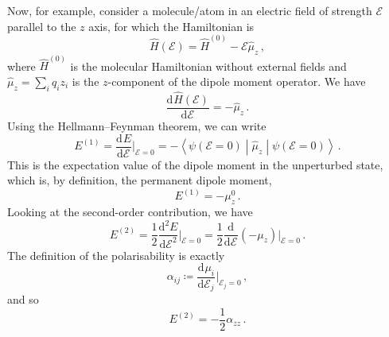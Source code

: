 \documentclass{article}
\theoremstyle{plain}\theoremheaderfont{\normalfont\itshape}\theorembodyfont{\rmfamily}\theoremseparator{.}\newtheorem*{rem}{Remark}\newtheorem*{ex}{Example}\newtheorem*{proof}{Proof}\newtheorem*{altp}{Alternative proof}
\theoremstyle{plain}\theoremheaderfont{\normalfont\bfseries}\theorembodyfont{\rmfamily}\theoremseparator{.}\newtheorem{thm}{Theorem}[section]\newtheorem{lem}[thm]{Lemma}\newtheorem{prop}[thm]{Proposition}\newtheorem*{cor}{Corollary}\newtheorem{defn}[thm]{Definition}\newtheorem{clm}[thm]{Claim}\newtheorem{clminproof}{Claim}
\theoremstyle{break}\theoremheaderfont{\normalfont\itshape}\theorembodyfont{\rmfamily}\theoremseparator{.\medskip}\newtheorem*{proofskip}{Proof}\newtheorem*{exs}{Examples}\newtheorem*{rems}{Remarks}
\theoremstyle{break}\theoremheaderfont{\normalfont\bfseries}\theorembodyfont{\rmfamily}\theoremseparator{.\medskip}\newtheorem{lemskip}[thm]{Lemma}\newtheorem{defnskip}[thm]{Definition}\newtheorem{propskip}[thm]{Proposition}\newtheorem{thmskip}[thm]{Theorem}
\numberwithin{equation}{section}
\newcommand{\dv}[3][]{\frac{\mathrm{d}^{#1} #2}{{\mathrm{d} #3}^{#1}}}
\newcommand{\expval}[2]{\left\langle #2 \middle| #1 \middle| #2 \right\rangle}
\begin{document}
    Now, for example, consider a molecule/atom in an electric field of strength \(\mathcal{E}\) parallel to the \(z\) axis, for which the Hamiltonian is
    \begin{equation}
        \hat{H}(\mathcal{E})=\hat{H}^{(0)}-\mathcal{E}\hat{\mu}_z\,,
    \end{equation} 
    where \(\hat{H}^{(0)}\) is the molecular Hamiltonian without external fields and \(\hat{\mu}_z=\sum_i q_i z_i\) is the \(z\)-component of the dipole moment operator. We have
    \begin{equation}
        \dv{\hat{H}(\mathcal{E})}{\mathcal{E}}=-\hat{\mu}_z\,.
    \end{equation}
    Using the Hellmann--Feynman theorem, we can write
    \begin{equation}
        E^{(1)}=\dv{E}{\mathcal{E}}\bigg|_{\mathcal{E}=0}=-\expval{\hat{\mu}_z}{\psi(\mathcal{E}=0)}\,.
    \end{equation}
    This is the expectation value of the dipole moment in the unperturbed state, which is, by definition, the permanent dipole moment,
    \begin{equation}
        E^{(1)}=-\mu_z^0\,.
    \end{equation}
    Looking at the second-order contribution, we have
    \begin{equation}
        E^{(2)}=\frac{1}{2}\dv[2]{E}{\mathcal{E}}\bigg|_{\mathcal{E}=0}=\frac{1}{2}\dv{}{\mathcal{E}}(-\mu_z)\bigg|_{\mathcal{E}=0}\,.
    \end{equation}
    The definition of the polarisability is exactly
    \begin{equation}
        \alpha_{ij}\coloneqq\dv{\mu_{i}}{\mathcal{E}_j}\bigg|_{\mathcal{E}_j=0}\,,
    \end{equation}
    and so
    \begin{equation}
        E^{(2)}=-\frac{1}{2}\alpha_{zz}\,.
    \end{equation}
\end{document}
